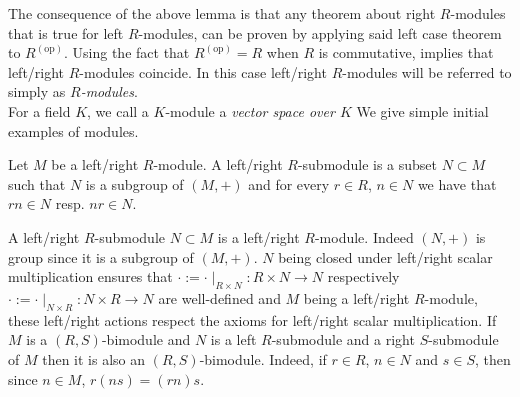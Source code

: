 The consequence of the above lemma is that any theorem about right $R$-modules that is true for left $R$-modules, can be proven by applying said left case theorem to $R^{(\mathrm{op})}$. Using the fact that $R^{(\text{op})}=R$ when $R$ is commutative, implies that left/right $R$-modules coincide. In this case left/right $R$-modules will be referred to simply as \textit{$R$-modules}.\\
For a field $K$, we call a $K$-module a \textit{vector space over $K$}
We give simple initial examples of modules.
\begin{definition}
    Let $M$ be a left/right $R$-module. A left/right $R$-submodule is a subset $N\subset M$ such that $N$ is a subgroup of $(M,+)$ and for every $r\in R$, $n\in N$ we have that $rn\in N$ resp. $nr \in N$.
\end{definition}
\begin{remark}
    A left/right $R$-submodule $N\subset M$ is a left/right $R$-module. Indeed $(N,+)$ is group since it is a subgroup of $(M,+)$. $N$ being closed under left/right scalar multiplication ensures that $\cdot := \cdot\mid_{R\times N} : R\times N \rightarrow N$ respectively $\cdot := \cdot\mid_{N \times R}: N\times R\rightarrow N$ are well-defined and $M$ being a left/right $R$-module, these left/right actions respect the axioms for left/right scalar multiplication. If $M$ is a $(R,S)$-bimodule and $N$ is a left $R$-submodule and a right $S$-submodule of $M$ then it is also an $(R,S)$-bimodule. Indeed, if $r\in R$, $n\in N$ and $s\in S$, then since $n\in M$, $r(ns)=(rn)s$.
\end{remark}
